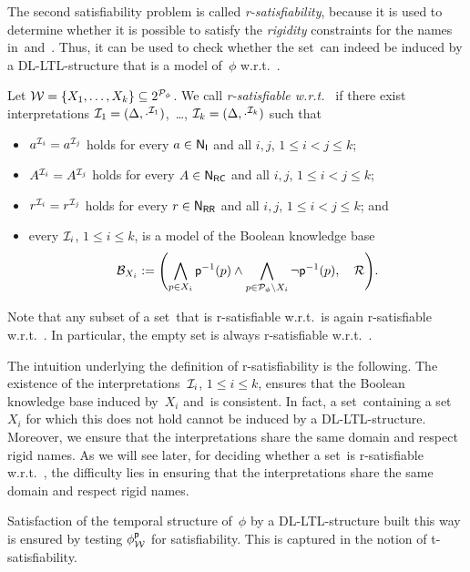 \noindent
The second satisfiability problem is called \emph{r-satisfiability}, because it
is used to determine whether it is possible to satisfy the \emph{rigidity}
constraints for the names in~\NRC and~\NRR.  Thus, it can be used to check
whether the set~\Wmc can indeed be induced by a DL-LTL-structure that is a model
of~$\phi$ w.r.t.~\Rmc.

\begin{definition}[R-satisfiability]\label{def:r-sat}
    Let $\mathcal{W}=\{X_1,\dots,X_k\}\subseteq 2^{\mathcal{P}_\phi}$.  We call \Wmc
    \emph{r-satisfiable w.r.t.~\Rmc} if there exist interpretations
    $\mathcal{I}_1=(\Delta,\cdot^{\mathcal{I}_1})$,~\dots, $\mathcal{I}_k=(\Delta,\cdot^{\mathcal{I}_k})$
    such that
    \begin{itemize}
        \item $a^{\mathcal{I}_i}=a^{\mathcal{I}_j}$ holds for every $a\in\mathsf{N_I}$ and all $i,j$,
            $1\le i<j\le k$;
        \item $A^{\mathcal{I}_i}=A^{\mathcal{I}_j}$ holds for every $A\in\mathsf{N_{RC}}$ and all $i,j$,
            $1\le i<j\le k$;
        \item $r^{\mathcal{I}_i}=r^{\mathcal{I}_j}$ holds for every $r\in\mathsf{N_{RR}}$ and all $i,j$,
            $1\le i<j\le k$; and
        \item every $\mathcal{I}_i$, $1\le i\le k$, is a model of the Boolean knowledge
            base
            \[\Bmc_{X_i}:=\Biggl(\bigwedge_{p\in X_i}\psf^{-1}(p)\land%
                \bigwedge_{p\in\Pmc_\phi\setminus X_i}\lnot\psf^{-1}(p),\quad\Rmc\Biggr).\]
    \end{itemize}
\end{definition}

\noindent
Note that any subset of a set~\Wmc that is r-satisfiable w.r.t.~\Rmc is again
r-satisfiable w.r.t.~\Rmc.  In particular, the empty set is always r-satisfiable
w.r.t.~\Rmc.

The intuition underlying the definition of r-satisfiability is the following.
The existence of the interpretations~$\mathcal{I}_i$, $1\le i\le k$, ensures that the
Boolean knowledge base induced by~$X_i$ and~\Rmc is consistent.  In fact, a
set~\Wmc containing a set~$X_i$ for which this does not hold cannot be induced
by a DL-LTL-structure.  Moreover, we ensure that the interpretations share the
same domain and respect rigid names.  As we will see later, for deciding whether
a set~\Wmc is r-satisfiable w.r.t.~\Rmc, the difficulty lies in ensuring that
the interpretations share the same domain and respect rigid names.

Satisfaction of the temporal structure of~$\phi$ by a DL-LTL-structure built
this way is ensured by testing $\phi^\mathsf{p}_\mathcal{W}$ for satisfiability.  This is
captured in the notion of t-satisfiability.

